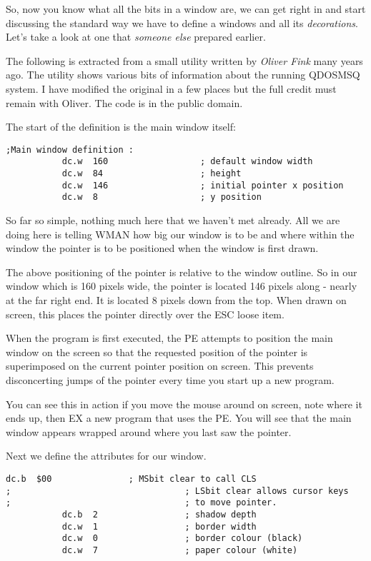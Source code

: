 So, now you know what all the bits in a window are, we can get right
    in and start discussing the standard way we have to define a windows and
    all its \emph{decorations}. Let's take a look at one that
 \emph{someone else} prepared earlier.

The following is extracted from a small utility written by \emph{Oliver
    Fink} many years ago. The utility shows various bits of information about
    the running QDOSMSQ system. I have modified the original in a few places
    but the full credit must remain with Oliver. The code is in the public
    domain.

The start of the definition is the main window itself:

\begin{lstlisting}[firstnumber=1,caption={Main Window - Fixed Part}]
;Main window definition :
           dc.w  160                  ; default window width
           dc.w  84                   ; height
           dc.w  146                  ; initial pointer x position 
           dc.w  8                    ; y position
\end{lstlisting}

So far so simple, nothing much here that we haven't met already. All
    we are doing here is telling WMAN how big our window is to be and where
    within the window the pointer is to be positioned when the window is first
    drawn.

The above positioning of the pointer is relative to the window
    outline. So in our window which is 160 pixels wide, the pointer is located
    146 pixels along -{} nearly at the far right end. It is located 8 pixels
    down from the top. When drawn on screen, this places the pointer directly
    over the ESC loose item.

When the program is first executed, the PE attempts to position the
    main window on the screen so that the requested position of the pointer is
    superimposed on the current pointer position on screen. This prevents
    disconcerting jumps of the pointer every time you start up a new
    program.

You can see this in action if you move the mouse around on screen,
    note where it ends up, then EX a new program that uses the PE. You will
    see that the main window appears wrapped around where you last saw the
    pointer.

Next we define the attributes for our window.

\begin{lstlisting}[firstnumber=last,caption={Main Window - Window Attributes}]
           dc.b  $00               ; MSbit clear to call CLS
;                                  ; LSbit clear allows cursor keys
;                                  ; to move pointer.
           dc.b  2                 ; shadow depth 
           dc.w  1                 ; border width 
           dc.w  0                 ; border colour (black)
           dc.w  7                 ; paper colour (white)
\end{lstlisting}


